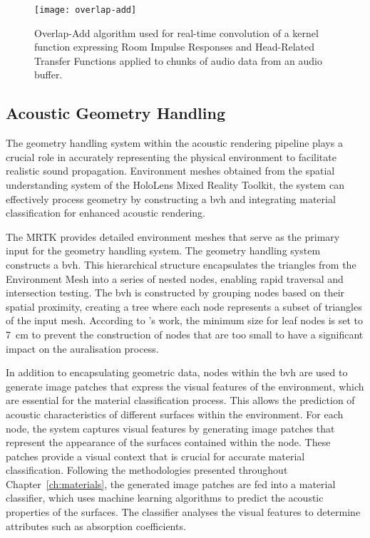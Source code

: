\begin{figure}[htb]
    \centering
    \texttt{[image: overlap-add]}
    \caption[Real-time convolution algorithm based on the Overlap-Add technique]{Overlap-Add algorithm used for real-time convolution of a kernel function expressing Room Impulse Responses and Head-Related Transfer Functions applied to chunks of audio data from an audio buffer.}\label{fig:overlap-add}
\end{figure}

\subsection{Acoustic Geometry Handling}
The geometry handling system within the acoustic rendering pipeline plays a crucial role in accurately representing the physical environment to facilitate realistic sound propagation. Environment meshes obtained from the spatial understanding system of the HoloLens Mixed Reality Toolkit, the system can effectively process geometry by constructing a \acrshort{bvh} and integrating material classification for enhanced acoustic rendering.\par
The MRTK provides detailed environment meshes that serve as the primary input for the geometry handling system. The geometry handling system constructs a \acrshort{bvh}. This hierarchical structure encapsulates the triangles from the Environment Mesh into a series of nested nodes, enabling rapid traversal and intersection testing. The \acrshort{bvh} is constructed by grouping nodes based on their spatial proximity, creating a tree where each node represents a subset of triangles of the input mesh. According to \cite{pelzer2010frequency}'s work, the minimum size for leaf nodes is set to \qty{7}{\cm} to prevent the construction of nodes that are too small to have a significant impact on the auralisation process.\par
In addition to encapsulating geometric data, nodes within the \acrshort{bvh} are used to generate image patches that express the visual features of the environment, which are essential for the material classification process. This allows the prediction of acoustic characteristics of different surfaces within the environment. For each node, the system captures visual features by generating image patches that represent the appearance of the surfaces contained within the node. These patches provide a visual context that is crucial for accurate material classification. Following the methodologies presented throughout Chapter~\ref{ch:materials}, the generated image patches are fed into a material classifier, which uses machine learning algorithms to predict the acoustic properties of the surfaces. The classifier analyses the visual features to determine attributes such as absorption coefficients.
